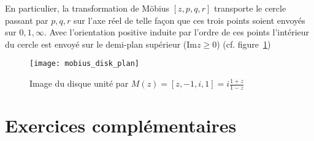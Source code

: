 En particulier, la transformation de Möbius $[z,p,q,r]$ transporte le cercle passant par $p,q,r$ sur l'axe réel de telle façon que ces trois points soient envoyés sur $0,1,\infty$. Avec l'orientation positive induite par l'ordre de ces points l'intérieur du cercle est envoyé sur le demi-plan supérieur ($\text{Im} z \geq 0$) (cf. figure~\ref{fig:Mob3}) 

\begin{figure}[ht] 
\begin{center}\texttt{[image: mobius\_disk\_plan]}
\end{center}
\caption{Image du disque unité par $M(z)=[z,-1,i,1] = i \frac{1+z}{1-z}$}\label{fig:Mob3}
\end{figure}

\section{Exercices complémentaires}


